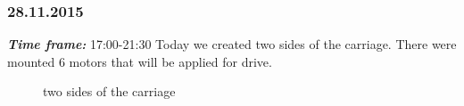 \subsubsection{28.11.2015}
\textit{\textbf{Time frame:}} 17:00-21:30 \newline
Today we created two sides of the carriage. There were mounted 6 motors that will be applied for drive.

\begin{figure}[H]
	\begin{minipage}[h]{1\linewidth}
		\caption{two sides of the carriage}
	\end{minipage}
\end{figure}